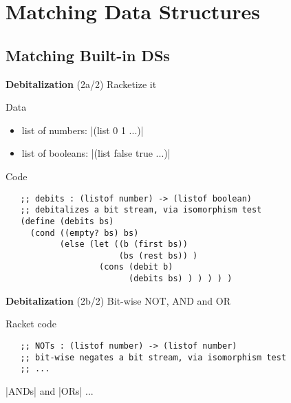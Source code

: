 \documentclass[14pt]{beamer}
\begin{document}
\section{Matching Data Structures}

\subsection{Matching Built-in DSs}

\begin{frame}[fragile]{{\bf Debitalization} (2a/2)}
 Racketize it

 \pause

 Data
 \begin{itemize}
  \item list of numbers: |(list 0 1 ...)|
  \item list of booleans: |(list false true ...)|
 \end{itemize}

 \pause

 Code
 {\scriptsize
  \begin{verbatim}
   ;; debits : (listof number) -> (listof boolean)
   ;; debitalizes a bit stream, via isomorphism test
   (define (debits bs)
     (cond ((empty? bs) bs)
           (else (let ((b (first bs))
                       (bs (rest bs)) )
                   (cons (debit b)
                         (debits bs) ) ) ) ) )
  \end{verbatim}
 }
\end{frame}

\begin{frame}[fragile]{{\bf Debitalization} (2b/2)}
 Bit-wise NOT, AND and OR

 \pause
 
 Racket code
 {\scriptsize
  \begin{verbatim}
   ;; NOTs : (listof number) -> (listof number)
   ;; bit-wise negates a bit stream, via isomorphism test
   ;; ...
  \end{verbatim}
 }

 \pause

 |ANDs| and |ORs| ...
\end{frame}
\end{document}
